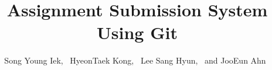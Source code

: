 \documentclass[10pt,journal,compsoc]{IEEEtran}
\begin{document}
\title{Assignment Submission System Using Git}

%
%
%
%

\author{Song Young Iek,~\IEEEmembership{}
        HyeonTaek Kong,~\IEEEmembership{}
	Lee Sang Hyun,~\IEEEmembership{}
        and JooEun Ahn~\IEEEmembership{}}%
\end{document}
